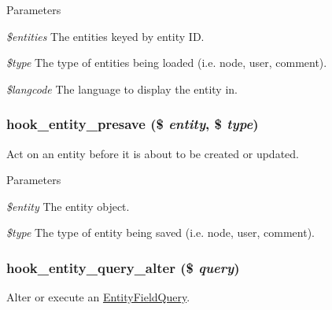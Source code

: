 \begin{DoxyParams}{Parameters}
\item[{\em \$entities}]The entities keyed by entity ID. \item[{\em \$type}]The type of entities being loaded (i.e. node, user, comment). \item[{\em \$langcode}]The language to display the entity in. \end{DoxyParams}
\hypertarget{group__hooks_ga1837f8059e89f6b0c00826f3e06e24f7}{
\subsubsection[{hook\_\-entity\_\-presave}]{\setlength{\rightskip}{0pt plus 5cm}hook\_\-entity\_\-presave (\$ {\em entity}, \/  \$ {\em type})}}
\label{group__hooks_ga1837f8059e89f6b0c00826f3e06e24f7}
Act on an entity before it is about to be created or updated.


\begin{DoxyParams}{Parameters}
\item[{\em \$entity}]The entity object. \item[{\em \$type}]The type of entity being saved (i.e. node, user, comment). \end{DoxyParams}
\hypertarget{group__hooks_ga22d97ef7297e17697cdaa8b32483f412}{
\subsubsection[{hook\_\-entity\_\-query\_\-alter}]{\setlength{\rightskip}{0pt plus 5cm}hook\_\-entity\_\-query\_\-alter (\$ {\em query})}}
\label{group__hooks_ga22d97ef7297e17697cdaa8b32483f412}
Alter or execute an \hyperlink{classEntityFieldQuery}{EntityFieldQuery}.


